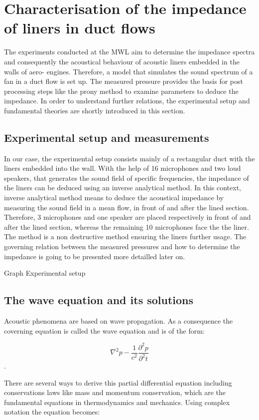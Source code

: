 \documentclass[11pt]{report} %
\begin{document}
\section{Characterisation of the impedance of liners in duct flows}
The experiments conducted at the MWL aim to determine the impedance spectra and consequently the acoustical behaviour of acoustic liners embedded in the walls of aero- engines.
Therefore, a model that simulates the sound spectrum of a fan in a duct flow is set up. 
The measured pressure provides the basis for post processing steps like the prony method to examine parameters to deduce the impedance.
In order to understand further relations, the experimental setup and fundamental theories are shortly introduced in this section. 


\subsection{Experimental setup and measurements}
In our case, the experimental setup consists mainly of a rectangular duct with the liners embedded into the wall.
With the help of 16 microphones and two loud speakers, that generates the sound field of specific frequencies, the impedance of the liners can be deduced using an inverse analytical method.
In this context, inverse analytical method means to deduce the acoustical impedance by measuring the sound field in a mean flow, in front of and after the lined section.
Therefore, 3 microphones and one speaker are placed respectively in front of and after the lined section, whereas the remaining 10 microphones face the the liner.
The method is a non destructive method ensuring the liners further usage.
The governing relation between the measured pressures and how to determine the impedance is going to be presented more detailled later on. 

Graph Experimental setup
	

\subsection{The wave equation and its solutions}
Acoustic phenomena are based on wave propagation. As a consequence the coverning equation is called the wave equation and is of the form: 

\begin{equation}
\nabla^2p-\frac{1}{c^2}\frac{\partial^2p}{\partial^2t}
\end{equation}. 

There are several ways to derive this partial differential equation including conservations laws like mass and momentum conservation, which are the fundamental equations in thermodynamics and mechanics. 
Using complex notation the equation becomes: 
\end{document}
